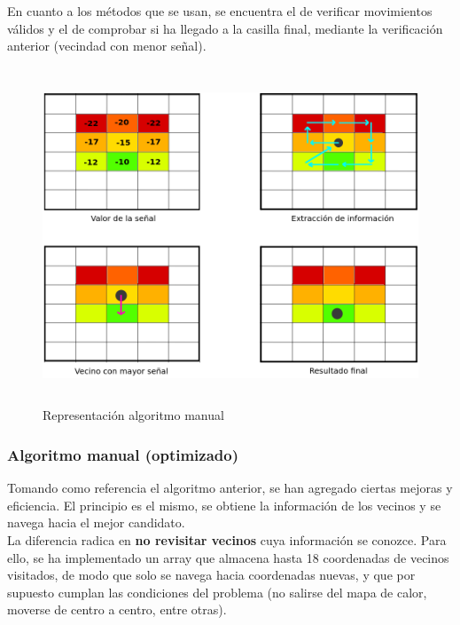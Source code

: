 En cuanto a los métodos que se usan, se encuentra el de verificar movimientos válidos y el de comprobar si ha llegado a la casilla final, mediante la verificación anterior (vecindad con menor señal).\\

\begin{figure} [H]
    \begin{center}
    \includegraphics[height=10cm]{imagenes/cap4/9_algoritmo_manual.png}
    \end{center}
    \caption[Representación algoritmo manual]{Representación algoritmo manual}
    \label{fig:manual_algorithm}
\end{figure}

\subsubsection{Algoritmo manual (optimizado)}
\label{subsec:alg-manual-opt}

Tomando como referencia el algoritmo anterior, se han agregado ciertas mejoras y eficiencia. El principio es el mismo, se obtiene la información de los vecinos y se navega hacia el mejor candidato.\\

La diferencia radica en \textbf{no revisitar vecinos} cuya información se conozce. Para ello, se ha implementado un array que almacena hasta 18 coordenadas de vecinos visitados, de modo que solo se navega hacia coordenadas nuevas, y que por supuesto cumplan las condiciones del problema (no salirse del mapa de calor, moverse de centro a centro, entre otras).\\

